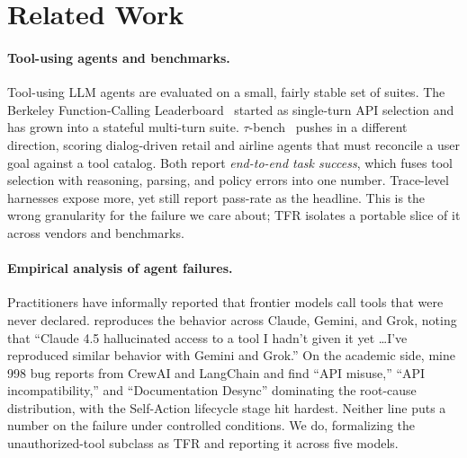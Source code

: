 \section{Related Work}
\label{sec:related}

\paragraph{Tool-using agents and benchmarks.}
Tool-using LLM agents are evaluated on a small, fairly stable set of
suites. The Berkeley Function-Calling Leaderboard~\citep{bfcl2024,bfclv4_2025}
started as single-turn API selection and has grown into a stateful
multi-turn suite. $\tau$-bench~\citep{taubench2024} pushes in a different
direction, scoring dialog-driven retail and airline agents that must
reconcile a user goal against a tool catalog. Both report
\emph{end-to-end task success}, which fuses tool selection with reasoning,
parsing, and policy errors into one number. Trace-level harnesses
\citep{appworld2024,reactagent2023} expose more, yet still report
pass-rate as the headline. This is the wrong granularity for the
failure we care about; TFR isolates a portable slice of it across
vendors and benchmarks.

\paragraph{Empirical analysis of agent failures.}
Practitioners have informally reported that frontier models call tools
that were never declared. \citet{czapla2026} reproduces the behavior
across Claude, Gemini, and Grok, noting that ``Claude 4.5 hallucinated
access to a tool I hadn't given it yet \ldots I've reproduced similar
behavior with Gemini and Grok.'' On the academic side,
\citet{bugstudy2026} mine 998 bug reports from CrewAI and LangChain
and find ``API misuse,'' ``API incompatibility,'' and ``Documentation
Desync'' dominating the root-cause distribution, with the Self-Action
lifecycle stage hit hardest. Neither line puts a number on the failure
under controlled conditions. We do, formalizing the unauthorized-tool
subclass as TFR and reporting it across five models.

